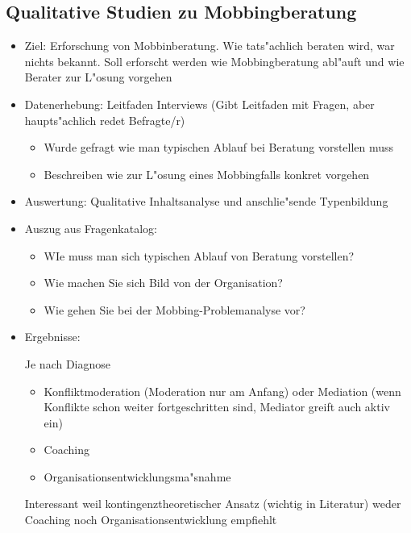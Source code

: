\subsection{Qualitative Studien zu Mobbingberatung}
\begin{itemize}
	\item
		Ziel: Erforschung von Mobbinberatung. Wie tats"achlich beraten wird, war nichts bekannt. Soll erforscht werden wie Mobbingberatung abl"auft und wie Berater zur L"osung vorgehen
	\item
		Datenerhebung: Leitfaden Interviews (Gibt Leitfaden mit Fragen, aber haupt\-s"ach\-lich redet Befragte/r)
		\begin{itemize}
			\item
				Wurde gefragt wie man typischen Ablauf bei Beratung vorstellen muss
			\item
				Beschreiben wie zur L"osung eines Mobbingfalls konkret vorgehen
		\end{itemize}
	\item
		Auswertung: Qualitative Inhaltsanalyse und anschlie"sende Typenbildung
	\item
		Auszug aus Fragenkatalog:
		\begin{itemize}
			\item
				WIe muss man sich typischen Ablauf von Beratung vorstellen?
			\item
				Wie machen Sie sich Bild von der Organisation?
			\item
				Wie gehen Sie bei der Mobbing-Problemanalyse vor?
		\end{itemize}
	\item
		Ergebnisse:

		Je nach Diagnose
		\begin{itemize}
			\item
				Konfliktmoderation (Moderation nur am Anfang) oder Mediation (wenn Konflikte schon weiter fortgeschritten sind, Mediator greift auch aktiv ein)
			\item
				Coaching
			\item
				Organisationsentwicklungsma"snahme
		\end{itemize}
		Interessant weil kontingenztheoretischer Ansatz (wichtig in Literatur) weder Coaching noch Organisationsentwicklung empfiehlt


\end{itemize}
